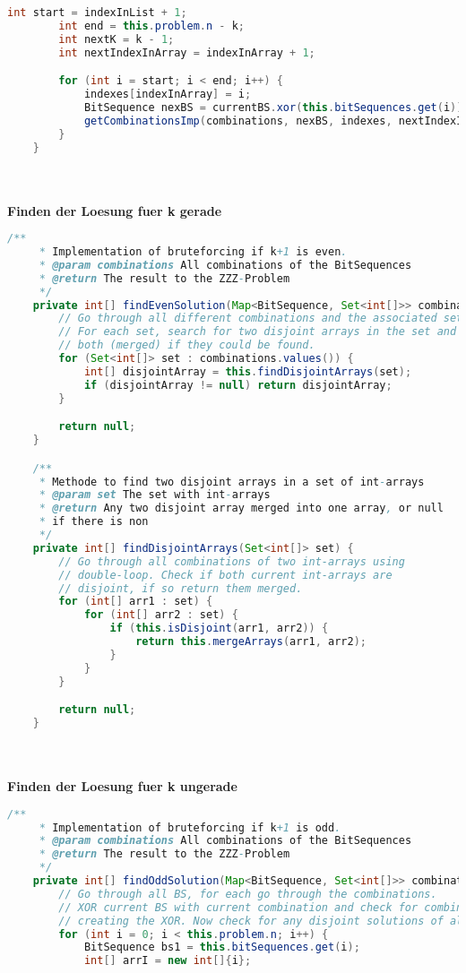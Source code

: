\documentclass[a4paper,10pt,ngerman]{scrartcl}
\begin{document}
{\begin{lstlisting}[language=Java]
        int start = indexInList + 1;
        int end = this.problem.n - k;
        int nextK = k - 1;
        int nextIndexInArray = indexInArray + 1;

        for (int i = start; i < end; i++) {
            indexes[indexInArray] = i;
            BitSequence nexBS = currentBS.xor(this.bitSequences.get(i));
            getCombinationsImp(combinations, nexBS, indexes, nextIndexInArray, i, nextK);
        }
    }
\end{lstlisting}
\\
\\
\textbf{Finden der Loesung fuer k gerade} \\
\begin{lstlisting}[language=Java]
		/**
     * Implementation of bruteforcing if k+1 is even.
     * @param combinations All combinations of the BitSequences
     * @return The result to the ZZZ-Problem
     */
    private int[] findEvenSolution(Map<BitSequence, Set<int[]>> combinations) {
        // Go through all different combinations and the associated set of< indexes.
        // For each set, search for two disjoint arrays in the set and return
        // both (merged) if they could be found.
        for (Set<int[]> set : combinations.values()) {
            int[] disjointArray = this.findDisjointArrays(set);
            if (disjointArray != null) return disjointArray;
        }

        return null;
    }

    /**
     * Methode to find two disjoint arrays in a set of int-arrays
     * @param set The set with int-arrays
     * @return Any two disjoint array merged into one array, or null
     * if there is non
     */
    private int[] findDisjointArrays(Set<int[]> set) {
        // Go through all combinations of two int-arrays using
        // double-loop. Check if both current int-arrays are
        // disjoint, if so return them merged.
        for (int[] arr1 : set) {
            for (int[] arr2 : set) {
                if (this.isDisjoint(arr1, arr2)) {
                    return this.mergeArrays(arr1, arr2);
                }
            }
        }

        return null;
    }
\end{lstlisting}
\\
\\
\textbf{Finden der Loesung fuer k ungerade} \\
\begin{lstlisting}[language=Java]
		/**
     * Implementation of bruteforcing if k+1 is odd.
     * @param combinations All combinations of the BitSequences
     * @return The result to the ZZZ-Problem
     */
    private int[] findOddSolution(Map<BitSequence, Set<int[]>> combinations) {
        // Go through all BS, for each go through the combinations.
        // XOR current BS with current combination and check for combinations
        // creating the XOR. Now check for any disjoint solutions of all BS.
        for (int i = 0; i < this.problem.n; i++) {
            BitSequence bs1 = this.bitSequences.get(i);
            int[] arrI = new int[]{i};


\end{lstlisting}}
\end{document}
